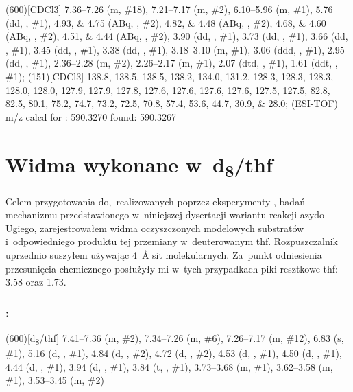 \begin{fullexp}
	\NMR(600)[CDCl3] \numrange{7.36}{7.26} (m, \#{18}), \numrange{7.21}{7.17} (m, \#{2}), \numrange{6.10}{5.96} (m, \#{1}), \num{5.76} (dd, , \#{1}), \numlist{4.93;4.75} (ABq, , \#{2}), \numlist{4.82;4.48} (ABq, , \#{2}), \numlist{4.68;4.60} (ABq, , \#{2}), \numlist{4.51;4.44} (ABq, , \#{2}), \num{3.90} (dd, , \#{1}), \num{3.73} (dd, , \#{1}), \num{3.66} (dd, , \#{1}), \num{3.45} (dd, , \#{1}), \num{3.38} (dd, , \#{1}), \numrange{3.18}{3.10} (m, \#{1}), \num{3.06} (ddd, , \#{1}), \num{2.95} (dd, , \#{1}), \numrange{2.36}{2.28} (m, \#{2}), \numrange{2.26}{2.17} (m, \#{1}), \num{2.07} (dtd, , \#{1}), \num{1.61} (ddt, , \#{1}); 
	(151)[CDCl3] \numlist{138.8; 138.5; 138.5; 138.2; 134.0; 131.2; 128.3; 128.3; 128.3; 128.0; 128.0; 127.9; 127.9; 127.8; 127.6; 127.6; 127.6; 127.6; 127.5; 127.5; 82.8; 82.5; 80.1; 75.2; 74.7; 73.2; 72.5; 70.8; 57.4; 53.6; 44.7; 30.9; 28.0}; 
	 (ESI-TOF) m/z calcd for : \num{590.3270} found: \num{590.3267}
\end{fullexp}


\section{Widma \NMR*{} wykonane w~d\textsubscript{8}\-/\acrshort{thf}}\label{experimental:thf}
Celem przygotowania do,~realizowanych poprzez eksperymenty \NMR*{}, badań mechanizmu przedstawionego
  w~niniejszej dysertacji wariantu reakcji azydo-Ugiego, zarejestrowałem widma oczyszczonych
  modelowych substratów i~odpowiedniego produktu tej przemiany w~deuterowanym \gls{thf}.
Rozpuszczalnik uprzednio suszyłem używając \SI{4}{\angstrom} sit molekularnych.
Za~punkt odniesienia przesunięcia chemicznego posłużyły mi w~tych przypadkach piki resztkowe
  \gls{thf}: \SI{3.58}{\ppm} oraz \SI{1.73}{\ppm}.

\pagebreak[1]%
\subsubsection[\refcmpd{glu-tet.cy}]{: }
\marginnote[1em]{}
\begin{experimental}
  \NMR(600)[d\textsubscript{8}\-/\acrshort{thf}] \numrange{7.41}{7.36} (m, \#{2}), \numrange{7.34}{7.26} (m, \#{6}), \numrange{7.26}{7.17} (m, \#{12}), \num{6.83} (s, \#{1}), \num{5.16} (d, , \#{1}), \num{4.84} (d, , \#{2}), \num{4.72} (d, , \#{2}), \num{4.53} (d, , \#{1}), \num{4.50} (d, , \#{1}), \num{4.44} (d, , \#{1}), \num{3.94} (d, , \#{1}), \num{3.84} (t, , \#{1}), \numrange{3.73}{3.68} (m, \#{1}), \numrange{3.62}{3.58} (m, \#{1}), \numrange{3.53}{3.45} (m, \#{2})
\end{experimental}

